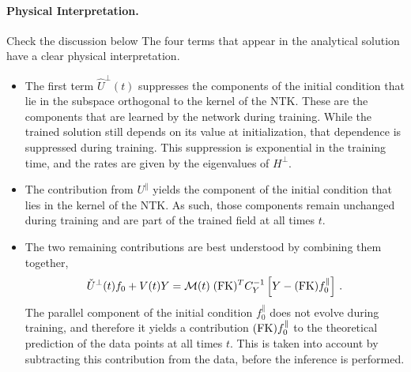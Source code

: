 \paragraph{Physical Interpretation.} \ac{Check the discussion below} The four terms that appear in the analytical solution have a clear physical interpretation. 
\begin{itemize}
    \item The first term $\hat{U}^\perp(t)$ suppresses the components of the initial condition that lie in the subspace orthogonal 
    to the kernel of the NTK. These are the components that are learned by the network during training. While the trained solution
    still depends on its value at initialization, that dependence is suppressed during training. This suppression 
    is exponential in the training time, and the rates are given by the eigenvalues of 
    $H^{\perp}$.
    \item The contribution from $U^\parallel$ yields the component of the initial condition that lies in the kernel of the NTK. 
    As such, those components remain unchanged during training and are part of the trained field at all times $t$. 
    \item The two remaining contributions are best understood by combining them together,
    \begin{align}
        \label{eq:DataCorrectedInference}
        \check{U}^{\perp}(t) f_{0} + V(t) Y 
            = \mathcal{M}(t)\; (\mathrm{FK})^T C_Y^{-1} \left[Y - (\mathrm{FK}) f_{0}^{\parallel}\right]\, .
    \end{align}
    The parallel component of the initial condition $f_{0}^{\parallel}$ does not evolve during training, and therefore it yields
    a contribution $(\mathrm{FK}) f_{0}^{\parallel}$ to the theoretical prediction of the data points at all times $t$. This is 
    taken into account by subtracting this
    contribution from the data, before the inference is performed.
\end{itemize}

